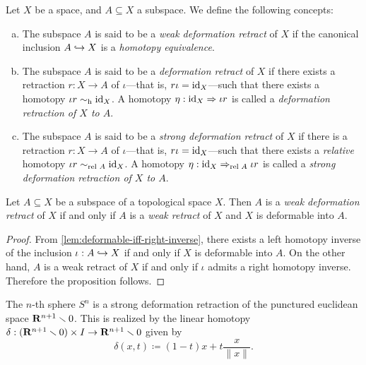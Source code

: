\begin{definition}
\label{def:deformation-retract}
Let \(X\) be a space, and \(A \subseteq X\) a subspace. We define the following
concepts:
\begin{enumerate}[(a)]\setlength\itemsep{0em}
\item The subspace \(A\) is said to be a \emph{weak deformation
    retract} of \(X\) if the canonical inclusion \(A \hookrightarrow X\) is a
  \emph{homotopy equivalence}.

\item The subspace \(A\) is said to be a \emph{deformation retract} of \(X\) if
  there exists a retraction \(r: X \to A\) of \(\iota\)---that is,
  \(r \iota = \operatorname{id}_X\)---such that there exists a homotopy
  \(\iota r \sim_{\text{h}} \operatorname{id}_X\). A homotopy \(\eta: \operatorname{id}_X \Rightarrow \iota r\) is called a
  \emph{deformation retraction of \(X\) to \(A\)}.

\item The subspace \(A\) is said to be a \emph{strong deformation retract} of
  \(X\) if there is a retraction \(r: X \to A\) of \(\iota\)---that is,
  \(r \iota = \operatorname{id}_X\)---such that there exists a \emph{relative} homotopy
  \(\iota r \sim_{\text{rel }{A}} \operatorname{id}_X\). A homotopy \(\eta: \operatorname{id}_X \Rightarrow_{\text{rel }{A}} \iota r\)
  is called a \emph{strong deformation retraction of \(X\) to \(A\)}.
\end{enumerate}
\end{definition}

\begin{lemma}
\label{lem:weak-deformation-retract-iff-weak-retract-and-deformable}
Let \(A \subseteq X\) be a subspace of a topological space \(X\). Then \(A\) is
a \emph{weak deformation retract} of \(X\) if and only if \(A\) is a \emph{weak
  retract} of \(X\) and \(X\) is deformable into \(A\).
\end{lemma}

\begin{proof}
From \cref{lem:deformable-iff-right-inverse}, there exists a left homotopy
inverse of the inclusion \(\iota: A \hookrightarrow X\) if and only if \(X\) is deformable
into \(A\). On the other hand, \(A\) is a weak retract of \(X\) if and only if
\(\iota\) admits a right homotopy inverse. Therefore the proposition follows.
\end{proof}

\begin{example}
\label{exp:Sn-is-strong-deformation-retract}
The \(n\)-th sphere \(S^n\) is a strong deformation retraction of the punctured
euclidean space \(\mathbf{R}^{n+1} \smallsetminus 0\). This is realized by the linear
homotopy \(\delta: (\mathbf{R}^{n+1} \smallsetminus 0) \times I \to \mathbf{R}^{n+1} \smallsetminus 0\)
given by
\[
\delta(x, t) \coloneq (1 - t) x + t \frac{x}{\| x \|}.
\]
\end{example}

